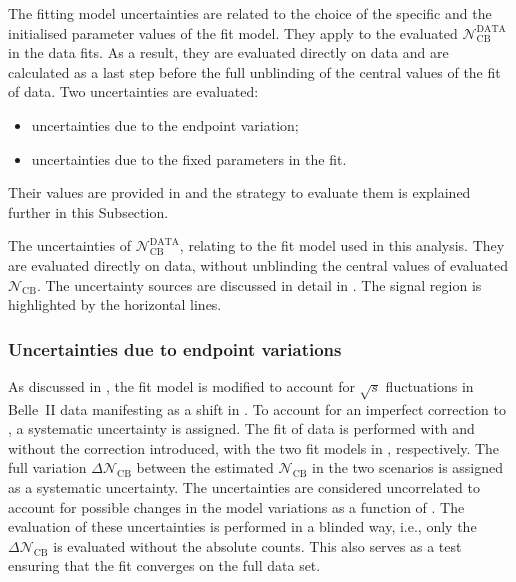 The \Mbc fitting model uncertainties are related to the choice of the specific  
and the initialised parameter values of the fit model.
They apply to the evaluated $\mathcal{N}^{\mathrm{DATA}}_{\mathrm{CB}}$ in the data fits.
As a result, they are evaluated directly on data and are calculated as a last step
before the full unblinding of the central values of the \Mbc fit of data.
Two uncertainties are evaluated:
\begin{itemize}
    \item uncertainties due to the \Mbc endpoint variation;
    \item uncertainties due to the fixed parameters in the \Mbc fit.
\end{itemize}
Their values are provided in  and the strategy to evaluate them is explained further in this Subsection.

\begin{table}[hbtp!]
    \centering
    \caption{\label{tab:fit_uncertainties} 
    The uncertainties of $\mathcal{N}^{\mathrm{DATA}}_{\mathrm{CB}}$, relating to the \Mbc fit model used in this analysis.
    They are evaluated directly on data, without unblinding the central values of evaluated $\mathcal{N}_{\mathrm{CB}}$.
    The uncertainty sources are discussed in detail in .
    The signal region is highlighted by the horizontal lines.
    }
    
\end{table}

\subsubsection{Uncertainties due to \texorpdfstring{\Mbc}{Mbc} endpoint variations}\label{sec:fit_endpoint_systematic}

As discussed in , the fit model is modified to account for $\sqrt{s}$ fluctuations in Belle~II data manifesting as a shift in \Mbc.
To account for an imperfect correction to \MC, a systematic uncertainty is assigned.
The fit of data is performed with and without the \Mbc correction introduced, with the two fit models in , respectively.
The full variation $\Delta\mathcal{N}_{\mathrm{CB}}$ between the estimated $\mathcal{N}_{\mathrm{CB}}$ in the two scenarios is assigned as a systematic uncertainty.
The uncertainties are considered uncorrelated to account for possible changes in the model variations as a function of \EB.
The evaluation of these uncertainties is performed in a blinded way, i.e., only the $\Delta\mathcal{N}_{\mathrm{CB}}$ is evaluated without the absolute counts.
This also serves as a test ensuring that the fit converges on the full data set.

